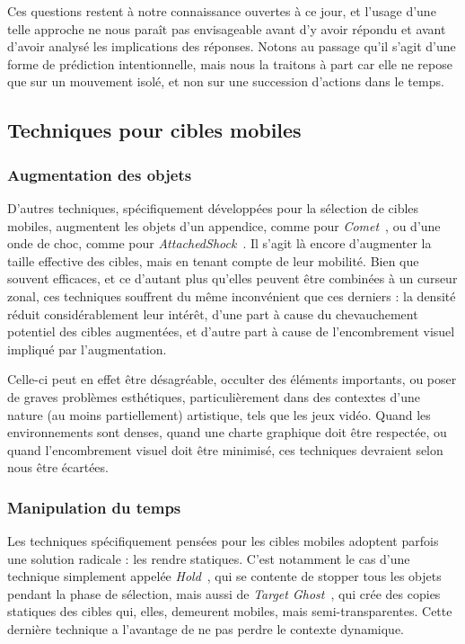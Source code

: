     Ces questions restent à notre connaissance ouvertes à ce jour, et l'usage d'une telle approche ne nous paraît pas envisageable avant d'y avoir répondu et avant d'avoir analysé les implications des réponses. Notons au passage qu'il s'agit d'une forme de prédiction intentionnelle, mais nous la traitons à part car elle ne repose que sur un mouvement isolé, et non sur une succession d'actions dans le temps.

    \subsection{Techniques pour cibles mobiles}
	\subsubsection{Augmentation des objets}
    D'autres techniques, spécifiquement développées pour la sélection de cibles mobiles, augmentent les objets d'un appendice, comme pour \emph{Comet}~\cite{hasan2011comet}, ou d'une onde de choc, comme pour \emph{AttachedShock}~\cite{you2012attachedshock, you2014attachedshock}. Il s'agit là encore d'augmenter la taille effective des cibles, mais en tenant compte de leur mobilité. Bien que souvent efficaces, et ce d'autant plus qu'elles peuvent être combinées à un curseur zonal, ces techniques souffrent du même inconvénient que ces derniers : la densité réduit considérablement leur intérêt, d'une part à cause du chevauchement potentiel des cibles augmentées, et d'autre part à cause de l'encombrement visuel impliqué par l'augmentation.
    
    Celle-ci peut en effet être désagréable, occulter des éléments importants, ou poser de graves problèmes esthétiques, particulièrement dans des contextes d'une nature (au moins partiellement) artistique, tels que les jeux vidéo. Quand les environnements sont denses, quand une charte graphique doit être respectée, ou quand l'encombrement visuel doit être minimisé, ces techniques devraient selon nous être écartées.
    
	\subsubsection{Manipulation du temps}
    Les techniques spécifiquement pensées pour les cibles mobiles adoptent parfois une solution radicale : les rendre statiques. C'est notamment le cas d'une technique simplement appelée \emph{Hold}~\cite{hajri2011moving}, qui se contente de stopper tous les objets pendant la phase de sélection, mais aussi de \emph{Target Ghost}~\cite{hasan2011comet}, qui crée des copies statiques des cibles qui, elles, demeurent mobiles, mais semi-transparentes. Cette dernière technique a l'avantage de ne pas perdre le contexte dynamique.
    
